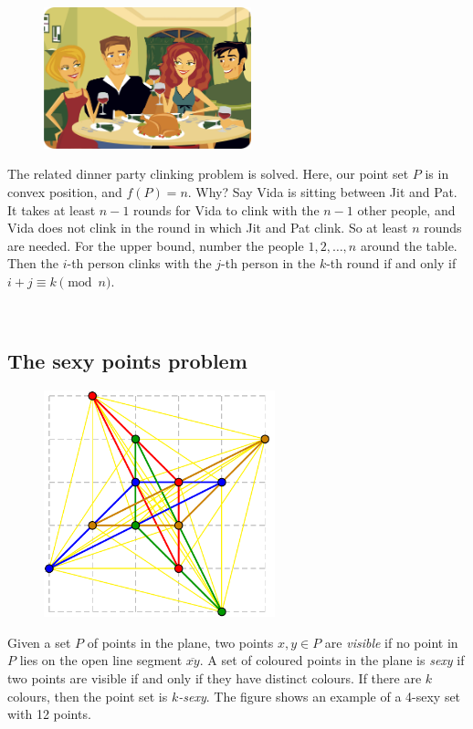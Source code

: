 \documentclass{patmorin}
\newcommand{\poser}[1]{\noindent{\textit{#1}}}
\begin{document}
\begin{figure}
\includegraphics[width=6cm]{dinner}
\end{figure}

The related dinner party clinking problem is solved. Here, our point
set $P$ is in convex position, and $f(P)=n$. Why? Say Vida is sitting
between Jit and Pat. It takes at least $n-1$ rounds for Vida to clink
with the $n-1$ other people, and Vida does not clink in the round in
which Jit and Pat clink. So at least $n$ rounds are needed. For the upper
bound, number the people $1,2,\dots,n$ around the table. Then the $i$-th
person clinks with the $j$-th person in the $k$-th round if and only if
$i+j\equiv k\pmod{n}$.

\ %

\subsection{The sexy points problem}

\poser{David Wood}

\begin{figure}
\hfill
\includegraphics[width=67mm]{K3333}
\end{figure}
Given a set $P$ of points in the plane, two points $x,y\in P$
are \emph{visible} if no point in $P$ lies on the open line segment
$\overline{xy}$. A set of coloured points in the plane is \emph{sexy}
if two points are visible if and only if they have distinct colours. If
there are $k$ colours, then the point set is \emph{$k$-sexy}. The figure
shows an example of a 4-sexy set with 12 points.
\end{document}
